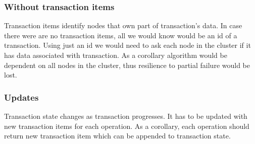 \subsubsection{Without transaction items}
Transaction items identify nodes that own part of transaction's data. 
In case there were are no transaction items, all we would know would be an id of a transaction.
Using just an id we would need to ask each node in the cluster if it has data associated with transaction. As a corollary algorithm would be dependent on all nodes in the cluster, thus resilience to partial failure would be lost.

\subsubsection{Updates}
Transaction state changes as transaction progresses. It has to be updated with new transaction items for each operation. As a corollary, each operation should return new transaction item which can be appended to transaction state. 

